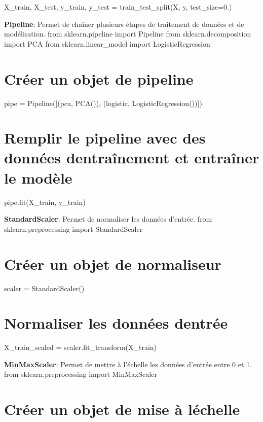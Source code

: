 X\+\_\+train, X\+\_\+test, y\+\_\+train, y\+\_\+test = train\+\_\+test\+\_\+split(X, y, test\+\_\+size=0.)


\begin{DoxyEnumerate}
\item {\bfseries Pipeline}\+: Permet de chaîner plusieurs étapes de traitement de données et de modélisation. from sklearn.\+pipeline import Pipeline from sklearn.\+decomposition import P\+CA from sklearn.\+linear\+\_\+model import Logistic\+Regression
\end{DoxyEnumerate}

\section*{Créer un objet de pipeline}

pipe = Pipeline(\mbox{[}(\textquotesingle{}pca\textquotesingle{}, P\+C\+A()), (\textquotesingle{}logistic\textquotesingle{}, Logistic\+Regression())\mbox{]})

\section*{Remplir le pipeline avec des données d\textquotesingle{}entraînement et entraîner le modèle}

pipe.\+fit(\+X\+\_\+train, y\+\_\+train)


\begin{DoxyEnumerate}
\item {\bfseries Standard\+Scaler}\+: Permet de normaliser les données d’entrée. from sklearn.\+preprocessing import Standard\+Scaler \section*{Créer un objet de normaliseur}
\end{DoxyEnumerate}

scaler = Standard\+Scaler() \section*{Normaliser les données d\textquotesingle{}entrée}

X\+\_\+train\+\_\+scaled = scaler.\+fit\+\_\+transform(\+X\+\_\+train)


\begin{DoxyEnumerate}
\item {\bfseries Min\+Max\+Scaler}\+: Permet de mettre à l’échelle les données d’entrée entre 0 et 1. from sklearn.\+preprocessing import Min\+Max\+Scaler \section*{Créer un objet de mise à l\textquotesingle{}échelle}
\end{DoxyEnumerate}

